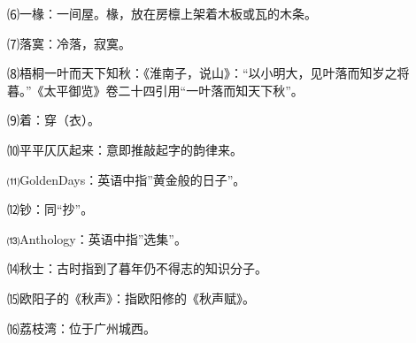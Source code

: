 \documentclass[letterpaper,10pt,english]{sphinxmanual}
\begin{document}
⑹一椽：一间屋。椽，放在房檩上架着木板或瓦的木条。

⑺落寞：冷落，寂寞。

⑻梧桐一叶而天下知秋：《淮南子，说山》：“以小明大，见叶落而知岁之将暮。”《太平御览》卷二十四引用“一叶落而知天下秋”。

⑼着：穿（衣）。

⑽平平仄仄起来：意即推敲起字的韵律来。

⑾GoldenDays：英语中指”黄金般的日子”。

⑿钞：同“抄”。

⒀Anthology：英语中指”选集”。

⒁秋士：古时指到了暮年仍不得志的知识分子。

⒂欧阳子的《秋声》：指欧阳修的《秋声赋》。

⒃荔枝湾：位于广州城西。
\end{document}
